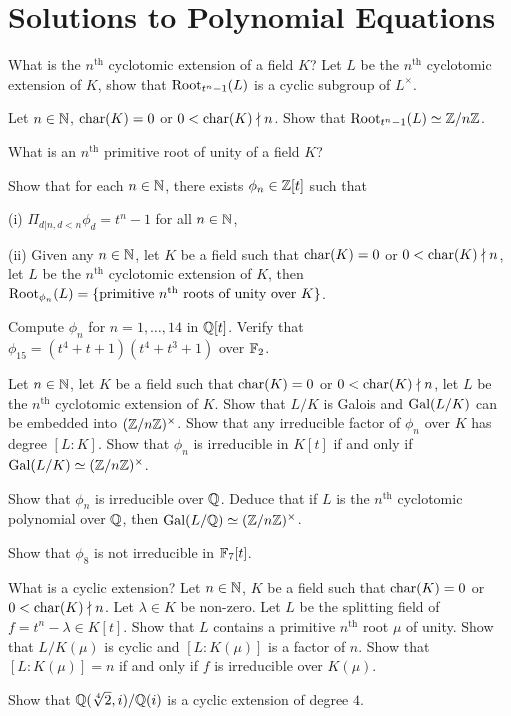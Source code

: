 \section{Solutions to Polynomial Equations}
\begin{question}{29}
    What is the $n^{\text{th}}$ cyclotomic extension of a field $K$? Let $L$ be the $n^{\text{th}}$ cyclotomic extension of $K$, show that $\text{Root}_{t^n-1}(L)$ is a cyclic subgroup of $L^\times$.

    Let $n \in \mathbb{N}$, $\text{char}(K) = 0$ or $0 < \text{char}(K) \nmid n$. Show that $\text{Root}_{t^n-1}(L) \simeq \mathbb{Z}/n\mathbb{Z}$.

    What is an $n^{\text{th}}$ primitive root of unity of a field $K$?

    Show that for each $n\in \mathbb{N}$, there exists $\phi_n \in \mathbb{Z}[t]$ such that 
    
    (i) $\Pi_{d|n, d<n} \phi_d = t^n-1$ for all $n \in \mathbb{N}$,

    (ii) Given any $n\in \mathbb{N}$, let $K$ be a field such that $\text{char}(K) = 0$ or $0 < \text{char}(K) \nmid n$, let $L$ be the $n^{\text{th}}$ cyclotomic extension of $K$, then $\text{Root}_{\phi_n}(L) = \{\text{primitive } n^{\text{th}} \text{ roots of unity over } K \}$.

    \bigskip

    Compute $\phi_n$ for $n = 1,\dots,14$ in $\mathbb{Q}[t]$. Verify that $\phi_{15} = (t^4 + t + 1)(t^4 + t^3 + 1)$ over $\mathbb{F}_2$.
\end{question}

\begin{question}{30}
    Let $n\in \mathbb{N}$, let $K$ be a field such that $\text{char}(K) = 0$ or $0 < \text{char}(K) \nmid n$, let $L$ be the $n^{\text{th}}$ cyclotomic extension of $K$. Show that $L/K$ is Galois and $\text{Gal}(L/K)$ can be embedded into $(\mathbb{Z}/n\mathbb{Z})^\times$. Show that any irreducible factor of $\phi_n$ over $K$ has degree $[L:K]$. Show that $\phi_n$ is irreducible in $K[t]$ if and only if $\text{Gal}(L/K) \simeq (\mathbb{Z}/n\mathbb{Z})^\times$.

    Show that $\phi_n$ is irreducible over $\mathbb{Q}$. Deduce that if $L$ is the $n^\text{th}$ cyclotomic polynomial over $\mathbb{Q}$, then $\text{Gal}(L/\mathbb{Q}) \simeq (\mathbb{Z}/n\mathbb{Z})^\times$.

    Show that $\phi_8$ is not irreducible in $\mathbb{F}_7[t]$.
\end{question}

\begin{question}{31}
    What is a cyclic extension? Let $n \in \mathbb{N}$, $K$ be a field such that $\text{char}(K) = 0$ or $0 < \text{char}(K) \nmid n$. Let $\lambda \in K$ be non-zero. Let $L$ be the splitting field of $f = t^n - \lambda \in K[t]$. Show that $L$ contains a primitive $n^\text{th}$ root $\mu$ of unity. Show that $L/K(\mu)$ is cyclic and $[L:K(\mu)]$ is a factor of $n$. Show that $[L:K(\mu)] = n$ if and only if $f$ is irreducible over $K(\mu)$. 

    Show that $\mathbb{Q}(\sqrt[4]{2},i)/\mathbb{Q}(i)$ is a cyclic extension of degree $4$.
\end{question}

